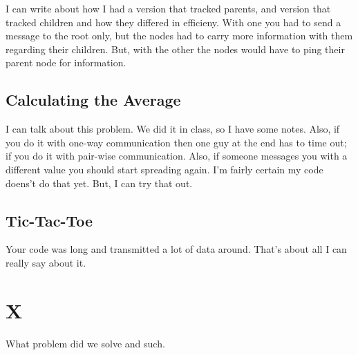 \documentclass[11pt,twocolumn]{article}
\begin{document}
I can write about how I had a version that tracked parents, and version that 
tracked children and how they differed in efficieny.  With one you had to
send a message to the root only, but the nodes had to carry more information
with them regarding their children.  But, with the other the nodes would have
to ping their parent node for information.

\subsection{Calculating the Average}

I can talk about this problem.  We did it in class, so I have some notes.  Also,
if you do it with one-way communication then one guy at the end has to time out;
if you do it with pair-wise communication.  Also, if someone messages you with
 a different value you should start spreading again.  I'm fairly certain my 
code doens't do that yet.  But, I can try that out.

\subsection{Tic-Tac-Toe}

Your code was long and transmitted a lot of data around.  That's about all I can
 really say about it.

\section{X}

What problem did we solve and such.
\end{document}
